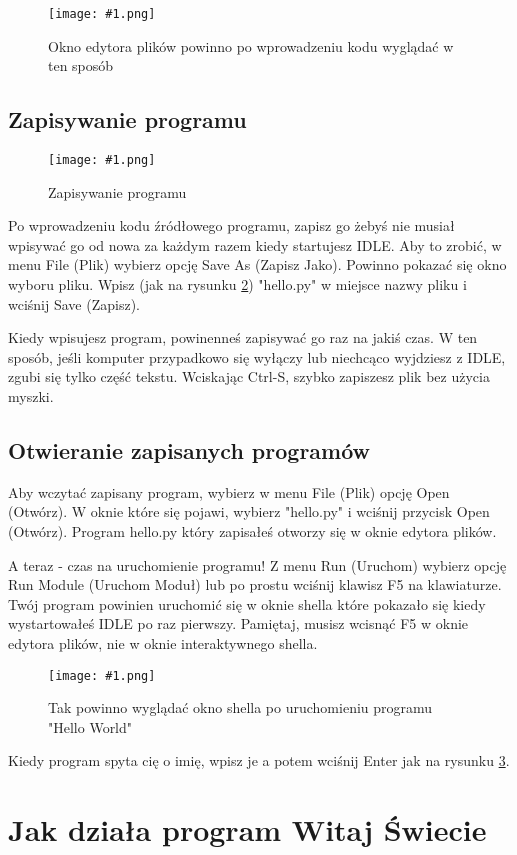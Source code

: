 \documentclass{book}
\newcommand{\img}[3]{
\begin{figure}
\centerline{
	\texttt{[image: \#1.png]}
}
\caption{#2}
\label{#1}
\end{figure}
}
\begin{document}
\img{strings-idle}{Okno edytora plików powinno po wprowadzeniu kodu  wyglądać w ten sposób}{10cm}

\subsection{Zapisywanie programu}

\img{strings-saveas}{Zapisywanie programu}{7cm}

Po wprowadzeniu kodu źródłowego programu, zapisz go żebyś nie musiał wpisywać go od nowa za każdym razem kiedy startujesz IDLE. Aby to zrobić, w menu File (Plik) wybierz opcję Save As (Zapisz Jako). Powinno pokazać się okno wyboru pliku. Wpisz (jak na rysunku \ref{strings-saveas}) "hello.py" w miejsce nazwy pliku i wciśnij Save (Zapisz).

Kiedy wpisujesz program, powinenneś zapisywać go raz na jakiś czas. W ten sposób, jeśli komputer przypadkowo się wyłączy lub niechcąco wyjdziesz z IDLE, zgubi się tylko część tekstu. Wciskając Ctrl-S, szybko zapiszesz plik bez użycia myszki.


\subsection{Otwieranie zapisanych programów}

Aby wczytać zapisany program, wybierz w menu File (Plik) opcję Open (Otwórz). W oknie które się pojawi, wybierz "hello.py" i wciśnij przycisk Open (Otwórz). Program hello.py który zapisałeś otworzy się w oknie edytora plików.

A teraz - czas na uruchomienie programu! Z menu Run (Uruchom) wybierz opcję Run Module (Uruchom Moduł) lub po prostu wciśnij klawisz F5 na klawiaturze. Twój program powinien uruchomić się w oknie shella które pokazało się kiedy wystartowałeś IDLE po raz pierwszy. Pamiętaj, musisz wcisnąć F5 w oknie edytora plików, nie w oknie interaktywnego shella.

\img{strings-hello}{Tak powinno wyglądać okno shella po uruchomieniu programu "Hello World"}{7cm}

Kiedy program spyta cię o imię, wpisz je a potem wciśnij Enter jak na rysunku \ref{strings-hello}.

\section{Jak działa program Witaj Świecie}
\end{document}

